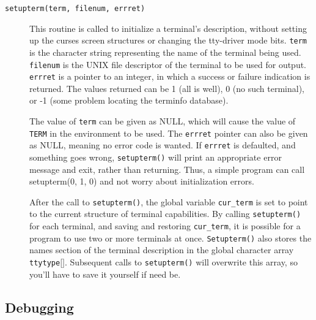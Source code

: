 \label{f0:lowlevel}\begin{description}\item[ \texttt{setupterm(term, filenum, errret)}]  This routine is called to initialize a terminal's description, without setting
up the curses screen structures or changing the tty-driver mode bits.
\texttt{term} is the character string representing the name of the terminal
being used.  \texttt{filenum} is the UNIX file descriptor of the terminal to
be used for output.  \texttt{errret} is a pointer to an integer, in which a
success or failure indication is returned.  The values returned can be 1 (all
is well), 0 (no such terminal), or -1 (some problem locating the terminfo
database). 

The value of \texttt{term} can be given as NULL, which will cause the value of
\texttt{TERM} in the environment to be used.  The \texttt{errret} pointer can
also be given as NULL, meaning no error code is wanted.  If \texttt{errret} is
defaulted, and something goes wrong, \texttt{setupterm()} will print an
appropriate error message and exit, rather than returning.  Thus, a simple
program can call setupterm(0, 1, 0) and not worry about initialization
errors. 

After the call to \texttt{setupterm()}, the global variable \texttt{cur\_term} is
set to point to the current structure of terminal capabilities. By calling
\texttt{setupterm()} for each terminal, and saving and restoring
\texttt{cur\_term}, it is possible for a program to use two or more terminals at
once.  \texttt{Setupterm()} also stores the names section of the terminal
description in the global character array \texttt{ttytype\mbox{$[$}\mbox{$]$}}.  Subsequent calls
to \texttt{setupterm()} will overwrite this array, so you'll have to save it
yourself if need be.
\end{description}

\subsection{Debugging}

